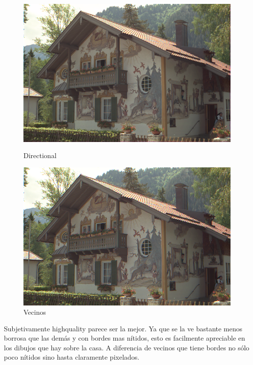 {\begin{figure}
\begin{center}
    \includegraphics[scale=0.3]{imagenes/img12_demosicing_spline.png}
    \caption{Directional}
        \end{center}
\endminipage
{}
\begin{center}
    \includegraphics[scale=0.3]{imagenes/img12_demosicing_vecino.png}
    \caption{Vecinos}
 \end{center}
\endminipage
 
\end{figure}
\newpage

Subjetivamente highquality parece ser la mejor. Ya que se la ve bastante menos borrosa que las demás y con bordes mas nítidos, esto es facilmente apreciable en los dibujos que hay sobre la casa. A diferencia de vecinos que tiene bordes no sólo poco nítidos sino hasta claramente pixelados.

}
